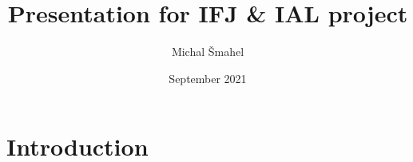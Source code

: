 \documentclass{article}
\title{Presentation for IFJ \& IAL project}
\author{Michal Šmahel}
\date{September 2021}
\begin{document}
\maketitle

\section{Introduction}
\end{document}
